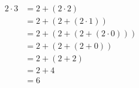 \documentclass[preview]{standalone}
\begin{document}
\begin{align*}
2 \cdot 3 &= 2 + (2 \cdot 2) \\ &= 2 + (2 + (2 \cdot 1)) \\ &= 2 + (2 + (2 + (2 \cdot 0))) \\ &= 2 + (2 + (2 + 0)) \\ &= 2 + (2 + 2) \\ &= 2 + 4 \\ &= 6
\end{align*}
\end{document}
